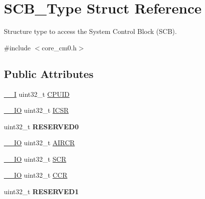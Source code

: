 \hypertarget{struct_s_c_b___type}{}\section{S\+C\+B\+\_\+\+Type Struct Reference}
\label{struct_s_c_b___type}


Structure type to access the System Control Block (S\+CB).  




{\ttfamily \#include $<$core\+\_\+cm0.\+h$>$}

\subsection*{Public Attributes}
\begin{DoxyCompactItemize}
\item 
\hyperlink{core__sc300_8h_af63697ed9952cc71e1225efe205f6cd3}{\+\_\+\+\_\+I} uint32\+\_\+t \hyperlink{struct_s_c_b___type_afa7a9ee34dfa1da0b60b4525da285032}{C\+P\+U\+ID}
\item 
\hyperlink{core__sc300_8h_aec43007d9998a0a0e01faede4133d6be}{\+\_\+\+\_\+\+IO} uint32\+\_\+t \hyperlink{struct_s_c_b___type_a3e66570ab689d28aebefa7e84e85dc4a}{I\+C\+SR}
\item 
uint32\+\_\+t {\bfseries R\+E\+S\+E\+R\+V\+E\+D0}\hypertarget{struct_s_c_b___type_a10960cdc703f661c83a237d9c69db23c}{}\label{struct_s_c_b___type_a10960cdc703f661c83a237d9c69db23c}

\item 
\hyperlink{core__sc300_8h_aec43007d9998a0a0e01faede4133d6be}{\+\_\+\+\_\+\+IO} uint32\+\_\+t \hyperlink{struct_s_c_b___type_a6ed3c9064013343ea9fd0a73a734f29d}{A\+I\+R\+CR}
\item 
\hyperlink{core__sc300_8h_aec43007d9998a0a0e01faede4133d6be}{\+\_\+\+\_\+\+IO} uint32\+\_\+t \hyperlink{struct_s_c_b___type_abfad14e7b4534d73d329819625d77a16}{S\+CR}
\item 
\hyperlink{core__sc300_8h_aec43007d9998a0a0e01faede4133d6be}{\+\_\+\+\_\+\+IO} uint32\+\_\+t \hyperlink{struct_s_c_b___type_a6d273c6b90bad15c91dfbbad0f6e92d8}{C\+CR}
\item 
uint32\+\_\+t {\bfseries R\+E\+S\+E\+R\+V\+E\+D1}\hypertarget{struct_s_c_b___type_adddd65958c1c4c0301f62ede0a9bf12e}{}\label{struct_s_c_b___type_adddd65958c1c4c0301f62ede0a9bf12e}


\end{DoxyCompactItemize}
